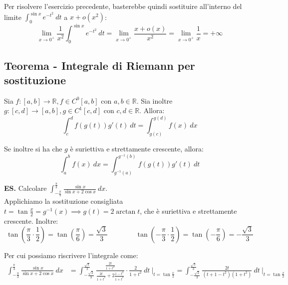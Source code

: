 \documentclass{article}
\begin{document}
\noindent Per risolvere l'esercizio precedente, basterebbe quindi sostituire all'interno del limite $\int_0^{\sin x} e^{-t^2} \ dt$ a $x + o(x^2)$:
\begin{equation*}
    \lim_{x \to 0^+} \frac{1}{x^2} \int_0^{\sin x} e^{-t^2} \ dt = \lim_{x \to 0^+} \frac{x + o(x)}{x^2} = \lim_{x \to 0^+} \frac{1}{x}  = +\infty
\end{equation*}

\subsection{Teorema - Integrale di Riemann per sostituzione}
Sia $f: [a, b] \xrightarrow{} \mathbb{R}, f \in C^0[a, b]$ con $a, b \in \mathbb{R}$. Sia inoltre $g: [c, d] \xrightarrow{} [a, b], g \in C^1[c, d]$ con $c, d \in \mathbb{R}$. Allora:
\begin{equation*}
    \int_c^d f(g(t))g'(t) \ dt = \int_{g(c)}^{g(d)} f(x) \ dx
\end{equation*}

\noindent Se inoltre si ha che $g$ è suriettiva e strettamente crescente, allora:
\begin{equation*}
    \int_a^b f(x) \ dx = \int_{g^{-1}(a)}^{g^{-1}(b)} f(g(t))g'(t) \ dt
\end{equation*}

\noindent\textbf{ES.} Calcolare $\int_{-\frac{\pi}{3}}^{\frac{\pi}{3}} \frac{\sin x}{\sin x + 2 \cos x} \ dx$. \\
Applichiamo la sostituzione consigliata $t = \tan\frac{x}{2} = g^{-1}(x) \implies g(t) = 2\arctan t$, che è suriettiva e strettamente crescente. Inoltre:
\begin{equation*}
    \tan\left(\frac{\pi}{3} \cdot \frac{1}{2}\right) = \tan\left(\frac{\pi}{6}\right) = \frac{\sqrt{3}}{3} \qquad \qquad \tan\left(-\frac{\pi}{3} \cdot \frac{1}{2}\right) = \tan\left(-\frac{\pi}{6}\right) = -\frac{\sqrt{3}}{3}
\end{equation*}

\noindent Per cui possiamo riscrivere l'integrale come:
\begin{align*}
    \int_{-\frac{\pi}{3}}^{\frac{\pi}{3}} \frac{\sin x}{\sin x + 2 \cos x} \ dx &= \int_{-\frac{\sqrt{3}}{3}}^{\frac{\sqrt{3}}{3}} \frac{\frac{2t}{1 + t^2}}{\frac{2t}{1 + t^2} + 2\frac{1 - t^2}{1 + t^2}} \cdot \frac{2}{1 +t ^2} \ dt \ \Bigg|_{t = \tan\frac{x}{2}} = \int_{-\frac{\sqrt{3}}{3}}^{\frac{\sqrt{3}}{3}} \frac{2t}{(t + 1 - t^2)(1 + t^2)} \ dt \ \Bigg|_{t = \tan\frac{x}{2}} \\ 
\end{align*}
\end{document}
